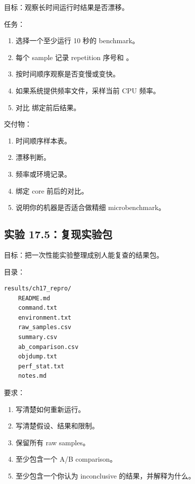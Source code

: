 \begin{labbox}
目标：观察长时间运行时结果是否漂移。

任务：

\begin{enumerate}
  \item 选择一个至少运行 10 秒的 benchmark。
  \item 每个 sample 记录 repetition 序号和 。
  \item 按时间顺序观察是否变慢或变快。
  \item 如果系统提供频率文件，采样当前 CPU 频率。
  \item 对比  绑定前后结果。
\end{enumerate}

交付物：

\begin{enumerate}
  \item 时间顺序样本表。
  \item 漂移判断。
  \item 频率或环境记录。
  \item 绑定 core 前后的对比。
  \item 说明你的机器是否适合做精细 microbenchmark。
\end{enumerate}
\end{labbox}

\subsection{实验 17.5：复现实验包}

\begin{labbox}
目标：把一次性能实验整理成别人能复查的结果包。

目录：

\begin{lstlisting}
results/ch17_repro/
    README.md
    command.txt
    environment.txt
    raw_samples.csv
    summary.csv
    ab_comparison.csv
    objdump.txt
    perf_stat.txt
    notes.md
\end{lstlisting}

要求：

\begin{enumerate}
  \item {} 写清楚如何重新运行。
  \item {} 写清楚假设、结果和限制。
  \item 保留所有 raw samples。
  \item 至少包含一个 A/B comparison。
  \item 至少包含一个你认为 inconclusive 的结果，并解释为什么。
\end{enumerate}
\end{labbox}

